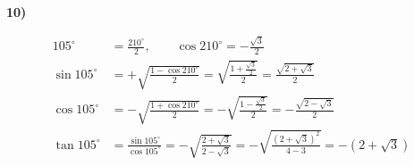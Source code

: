 \documentclass[11pt,a4paper,fleqn]{article}
\begin{document}
\textbf{10)}

\begin{align*}
  105^{\circ} &= \frac{210^{\circ}}{2}, \qquad
  \cos 210^{\circ} = -\frac{\sqrt{3}}{2} \\[10pt]
  \sin 105^{\circ}
    &= +\sqrt{\frac{1 - \cos 210^{\circ}}{2}}
     = \sqrt{\frac{1 + \frac{\sqrt{3}}{2}}{2}}
     = \frac{\sqrt{2 + \sqrt{3}}}{2} \\[10pt]
  \cos 105^{\circ}
    &= -\sqrt{\frac{1 + \cos 210^{\circ}}{2}}
     = -\sqrt{\frac{1 - \frac{\sqrt{3}}{2}}{2}}
     = -\frac{\sqrt{2 - \sqrt{3}}}{2} \\[10pt]
  \tan 105^{\circ}
    &= \frac{\sin 105^{\circ}}{\cos 105^{\circ}}
     = -\sqrt{\frac{2 + \sqrt{3}}{2 - \sqrt{3}}}
     = -\sqrt{\frac{(2 + \sqrt{3})^{2}}{4 - 3}}
     = -\left( 2 + \sqrt{3} \right)
\end{align*}
\end{document}
